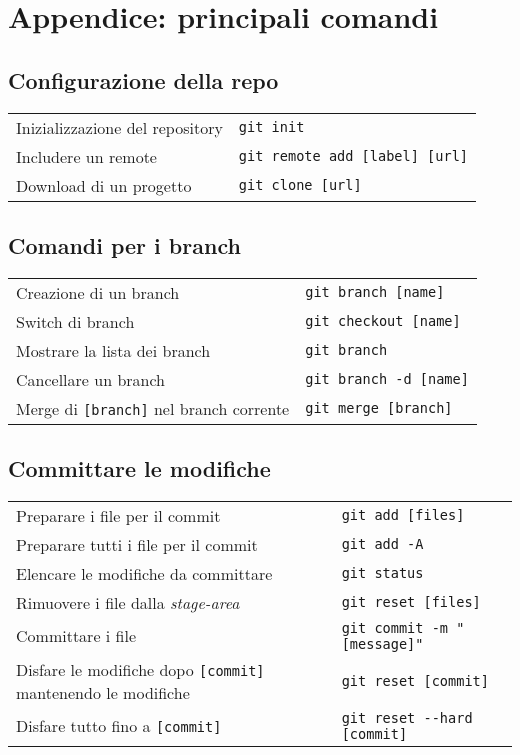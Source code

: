 \documentclass[a4paper, 11pt]{article}
\begin{document}
		\section{Appendice: principali comandi}
		\subsection{Configurazione della repo}
		\begin{tabular}{p{9cm} p{6cm}}
			Inizializzazione del repository &\verb|git init| \\
			Includere un remote &\verb|git remote add [label] [url]| \\
			Download di un progetto &\verb|git clone [url]| \\
		\end{tabular}
		
		\subsection{Comandi per i branch}
		\begin{tabular}{p{9cm} p{6cm}}
			Creazione di un branch & \verb|git branch [name]| \\
			Switch di branch& \verb|git checkout [name]| \\
			Mostrare la lista dei branch & \verb|git branch| \\
			Cancellare un branch& \verb|git branch -d [name]| \\
			Merge di \verb|[branch]| nel branch corrente& \verb|git merge [branch]|
		\end{tabular}
		
		\subsection{Committare le modifiche}
		\begin{tabular}{p{9cm} p{6cm}}
			Preparare i file per il commit& \verb|git add [files]| \\
			Preparare tutti i file per il commit& \verb|git add -A| \\
			Elencare le modifiche da committare& \verb|git status|\\
			Rimuovere i file dalla \textit{stage-area}& \verb|git reset [files]|\\
			Committare i file& \verb|git commit -m "[message]"| \\
			Disfare le modifiche dopo \verb|[commit]| mantenendo le modifiche& \verb|git reset [commit]| \\
			Disfare tutto fino a \verb|[commit]|& \verb|git reset --hard [commit]|
		\end{tabular}
		
\end{document}
